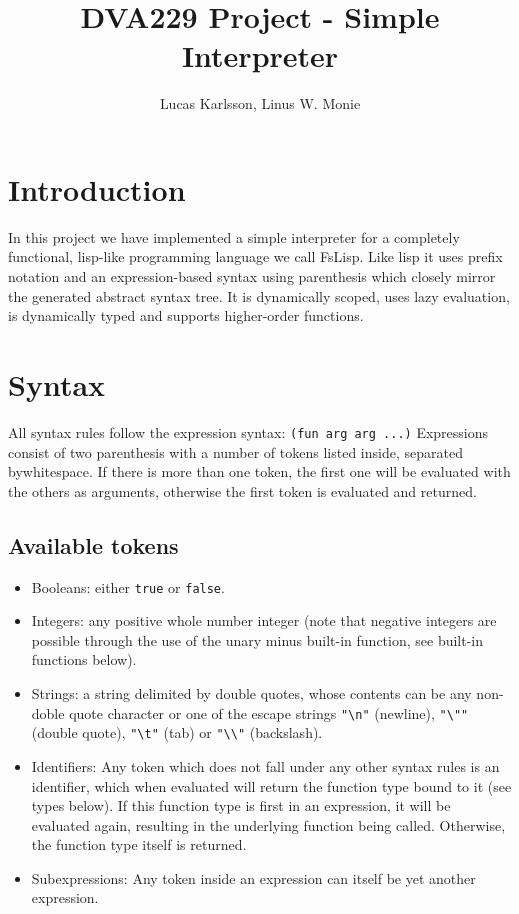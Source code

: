 \documentclass[11pt]{article}
\title{DVA229 Project - Simple Interpreter}
\author{Lucas Karlsson, Linus W. Monie}
\begin{document}
\maketitle

\section*{Introduction}

    In this project we have implemented a simple interpreter for a completely functional, lisp-like programming language we call FsLisp. Like lisp it uses
    prefix notation and an expression-based syntax using parenthesis which closely mirror the generated abstract syntax tree. It is dynamically scoped, 
    uses lazy evaluation, is dynamically typed and supports higher-order functions.

\section{Syntax}
    
    All syntax rules follow the expression syntax:
    \lstinline{(fun arg arg ...)}\newline
    Expressions consist of two parenthesis with a number of tokens listed inside, separated by\newline whitespace. If there is more than one token,
    the first one will be evaluated with the others as arguments, otherwise the first token is evaluated and returned.
    
    \subsection{Available tokens}
        \begin{itemize}
            \item Booleans: either \lstinline{true} or \lstinline{false}.
            \item Integers: any positive whole number integer (note that negative integers are possible through the use of the unary minus built-in function, see built-in functions below).
            \item Strings: a string delimited by double quotes, whose contents can be any non-doble quote character or one of the escape strings
                  \lstinline{"\n"} (newline), \lstinline{"\""} (double quote), \lstinline{"\t"} (tab) or \lstinline{"\\"} (backslash).
            \item Identifiers: Any token which does not fall under any other syntax rules is an identifier, which when evaluated will return the function type bound to it (see types below). If this function type is first in an expression, it will be evaluated again, resulting in the underlying function being called. Otherwise, the function type itself is returned.
        \item Subexpressions: Any token inside an expression can itself be yet another expression.
        \end{itemize}
\end{document}
